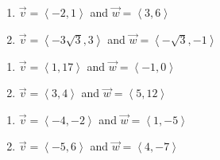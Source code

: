 \documentclass{ximera}
\begin{document}
\begin{multicols}{2} 

\begin{enumerate}

\setcounter{enumi}{\value{HW}}

\item $\vec{v} = \left\langle -2,1 \right\rangle$ and $\vec{w} = \left\langle 3,6 \right\rangle$
\item $\vec{v} = \left\langle -3\sqrt{3}, 3\right\rangle$ and $\vec{w} = \left\langle -\sqrt{3}, -1 \right\rangle$

\setcounter{HW}{\value{enumi}}

\end{enumerate}

\end{multicols}

\begin{multicols}{2} 

\begin{enumerate}

\setcounter{enumi}{\value{HW}}

\item $\vec{v} = \left\langle 1, 17 \right\rangle$ and $\vec{w} = \left\langle -1, 0 \right\rangle$
\item $\vec{v} = \left\langle 3, 4 \right\rangle$ and $\vec{w} = \left\langle 5, 12 \right\rangle$

\setcounter{HW}{\value{enumi}}

\end{enumerate}

\end{multicols}

\begin{multicols}{2} 

\begin{enumerate}

\setcounter{enumi}{\value{HW}}

\item $\vec{v} = \left\langle -4, -2 \right\rangle$ and $\vec{w} = \left\langle 1, -5 \right\rangle$
\item $\vec{v} = \left\langle -5, 6 \right\rangle$ and $\vec{w} = \left\langle 4, -7 \right\rangle$

\setcounter{HW}{\value{enumi}}

\end{enumerate}

\end{multicols}
\end{document}

